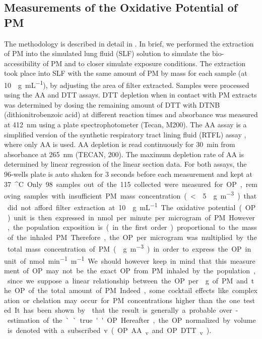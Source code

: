 \documentclass[acp, manuscript]{copernicus}
\begin{document}
\subsection{Measurements of the Oxidative Potential of
PM}\label{measurements-of-the-oxidative-potential-of-pm}

The methodology is described in detail in \citet{calas_importance_2017}. In
brief, we performed the extraction of PM into the simulated lung fluid (SLF)
solution to simulate the bio-accessibility of PM and to closer simulate
exposure conditions. The extraction took place into SLF with the same amount of PM by
mass for each sample (at 10~\unit{\mu g~mL^{-1}}), by adjusting the area of filter
extracted. Samples were processed using the AA and DTT assays. DTT depletion
when in contact with PM extracts was determined by dosing the remaining amount
of DTT with DTNB (dithionitrobenzoic acid) at different reaction times and 
absorbance was measured at
412~\unit{nm} using a plate spectrophotometer (Tecan, M200). The AA assay is a
simplified version of the synthetic respiratory tract lining fluid (RTFL) assay
\citep{kelly_protein_2003}, where only AA is used. AA depletion is read
continuously for 30~\unit{min} from absorbance at 265~\unit{nm} (TECAN, 200). The maximum depletion rate of AA
is determined by linear regression of the linear section data. For both assays,
the 96-wells plate is auto shaken for 3 seconds before each measurement and kept
at 37~\unit{^\circ C}.

Only 98 samples out of the 115 collected were measured for OP, removing samples
with insufficient PM mass concentration (\textless{}5~\unit{\mu g~m^{-3}}) that did
not afford filter extraction at 10~\unit{\mu g~mL^{-1}}. The oxidative potential
(OP) unit is then expressed in nmol per minute per microgram of PM. However, the
population exposition is (in the first order) proportional to the mass of the inhaled PM. Therefore, the OP per
microgram was multiplied by the total mass concentration of PM (\unit{\mu
g~m^{-3}}) in order to
express the OP in unit of~\unit{nmol~min^{-1}~m^{-1}}. We should however keep in mind
that this measurement of OP may not be the exact OP from PM inhaled by the
population, since we suppose a linear relationship between the OP per~\unit{\mu g}
of PM and the OP of the total amount of PM. Indeed, some cocktail effects
like complexation or chelation may occur for PM concentrations higher than the
one tested. It has been shown by \citet{calas_importance_2017} that the result
is generally a probable over-estimation of the ``true'' OP. Hereafter, the OP
normalized by volume is denoted with a subscribed v (OP AA\textsubscript{v} and
OP DTT\textsubscript{v}).
\end{document}

